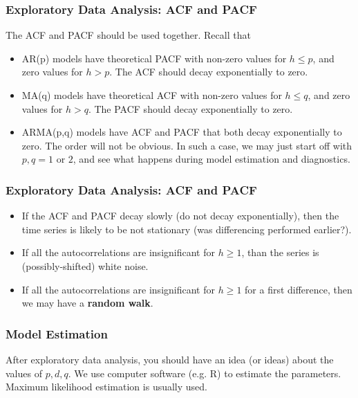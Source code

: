 \documentclass[%
xcolor=pdftex]{beamer}
\begin{document}
\begin{frame}
\frametitle{Exploratory Data Analysis: ACF and PACF}

The ACF and PACF should be used together. Recall that

\begin{itemize}
\item AR(p) models have theoretical PACF with non-zero values for $h \leq p$, and zero values for $h>p$. The ACF should decay exponentially to zero.
\item MA(q) models have theoretical ACF with non-zero values for $h \leq q$, and zero values for $h>q$. The PACF should decay exponentially to zero.
\item ARMA(p,q) models have ACF and PACF that both decay exponentially to zero. The order will not be obvious. In such a case, we may just start off with $p,q = 1 \text{ or } 2$, and see what happens during model estimation and diagnostics.
\end{itemize}


\end{frame}

\begin{frame}
\frametitle{Exploratory Data Analysis: ACF and PACF}

\begin{itemize}
\item If the ACF and PACF decay slowly (do not decay exponentially), then the time series is likely to be not stationary (was differencing performed earlier?).
\item If all the autocorrelations are insignificant for $h \geq 1$, than the series is (possibly-shifted) white noise.
\item If all the autocorrelations are insignificant for $h \geq 1$ for a first difference, then we may have a \textbf{random walk}.
\end{itemize}


\end{frame}


\begin{frame}
\frametitle{Model Estimation}

After exploratory data analysis, you should have an idea (or ideas) about the values of $p,d,q$. We use computer software (e.g. R) to estimate the parameters. Maximum likelihood estimation is usually used.

\end{frame}
\end{document}
